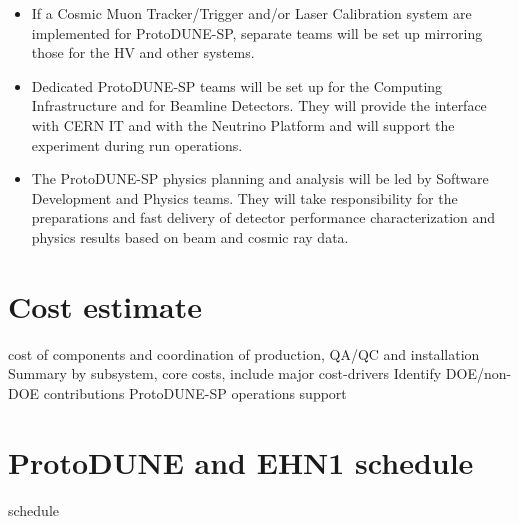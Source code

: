 \begin{itemize}
\item If a Cosmic Muon Tracker/Trigger and/or Laser Calibration system are implemented for ProtoDUNE-SP, separate teams will be set up mirroring those for the HV and other systems. 
\item Dedicated ProtoDUNE-SP teams will be set up for the Computing Infrastructure and for Beamline Detectors. They will provide the interface with CERN IT and with the Neutrino Platform and will support the experiment during run operations.
\item The ProtoDUNE-SP physics planning and analysis will be led by Software Development and Physics teams. They will take responsibility for the preparations and fast delivery of detector performance characterization and physics results based on beam and cosmic ray data.
\end{itemize}

\section{Cost estimate}

cost of components and coordination of production, QA/QC and installation\\

Summary by subsystem, core costs, include major cost-drivers
Identify DOE/non-DOE contributions
ProtoDUNE-SP operations support


\section{ProtoDUNE and EHN1 schedule}

schedule\\

